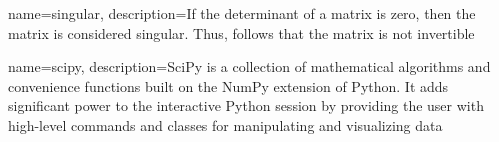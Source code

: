 {
    name=singular,
    description={If the determinant of a matrix is zero, then the matrix is considered singular. Thus, follows that the matrix is not invertible}
}

{
    name=scipy,
    description={SciPy is a collection of mathematical algorithms and convenience functions built on the NumPy extension of Python. It adds significant power to the interactive Python session by providing the user with high-level commands and classes for manipulating and visualizing data \cite{2020SciPy}}
}
